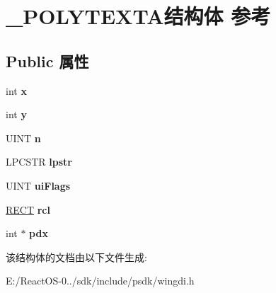 \hypertarget{struct___p_o_l_y_t_e_x_t_a}{}\section{\+\_\+\+P\+O\+L\+Y\+T\+E\+X\+T\+A结构体 参考}
\label{struct___p_o_l_y_t_e_x_t_a}
\subsection*{Public 属性}
\begin{DoxyCompactItemize}
\item 
\mbox{\label{struct___p_o_l_y_t_e_x_t_a_a632afeede51316adae272c8c067335ed}} 
int {\bfseries x}
\item 
\mbox{\label{struct___p_o_l_y_t_e_x_t_a_a872dfc921e7d35bbee8ce50b9457a872}} 
int {\bfseries y}
\item 
\mbox{\label{struct___p_o_l_y_t_e_x_t_a_af2f3c08d911fee2ba14baf82fe79ef41}} 
U\+I\+NT {\bfseries n}
\item 
\mbox{\label{struct___p_o_l_y_t_e_x_t_a_a1c38a5f549e8252221d45c63648aa679}} 
L\+P\+C\+S\+TR {\bfseries lpstr}
\item 
\mbox{\label{struct___p_o_l_y_t_e_x_t_a_a554fc27dd1980246b42fa73c428bc66d}} 
U\+I\+NT {\bfseries ui\+Flags}
\item 
\mbox{\label{struct___p_o_l_y_t_e_x_t_a_a1013b2706c715c92b41aa945085e89aa}} 
\hyperlink{structtag_r_e_c_t}{R\+E\+CT} {\bfseries rcl}
\item 
\mbox{\label{struct___p_o_l_y_t_e_x_t_a_adfec46cdf9e8f68c689df21b1a451a24}} 
int $\ast$ {\bfseries pdx}
\end{DoxyCompactItemize}


该结构体的文档由以下文件生成\+:\begin{DoxyCompactItemize}
\item 
E\+:/\+React\+O\+S-\/0../sdk/include/psdk/wingdi.\+h\end{DoxyCompactItemize}
